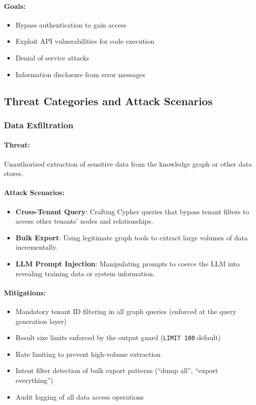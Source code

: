 \paragraph{Goals:}
\begin{itemize}
    \item Bypass authentication to gain access
    \item Exploit API vulnerabilities for code execution
    \item Denial of service attacks
    \item Information disclosure from error messages
\end{itemize}

\subsection{Threat Categories and Attack Scenarios}
\label{subsec:threat-categories}

\subsubsection{Data Exfiltration}

\paragraph{Threat:} Unauthorized extraction of sensitive data from the knowledge graph or other data stores.

\paragraph{Attack Scenarios:}
\begin{itemize}
    \item \textbf{Cross-Tenant Query}: Crafting Cypher queries that bypass tenant filters to access other tenants' nodes and relationships.
    \item \textbf{Bulk Export}: Using legitimate graph tools to extract large volumes of data incrementally.
    \item \textbf{LLM Prompt Injection}: Manipulating prompts to coerce the LLM into revealing training data or system information.
\end{itemize}

\paragraph{Mitigations:}
\begin{itemize}
    \item Mandatory tenant ID filtering in all graph queries (enforced at the query generation layer)
    \item Result size limits enforced by the output guard (\texttt{LIMIT 100} default)
    \item Rate limiting to prevent high-volume extraction
    \item Intent filter detection of bulk export patterns (``dump all'', ``export everything'')
    \item Audit logging of all data access operations
\end{itemize}

